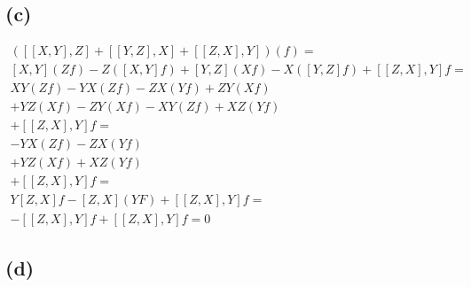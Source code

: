 \documentclass{article}
\begin{document}
\subsection*{(c)}
\begin{multline*}
([[X,Y],Z] +[[Y,Z],X] +[[Z,X],Y])(f)=\\
[X,Y](Zf)-Z([X,Y]f)
+[Y,Z](Xf)-X([Y,Z]f)
+[[Z,X],Y]f=\\
XY(Zf)-YX(Zf)-ZX(Yf)+ZY(Xf)\\
+YZ(Xf)-ZY(Xf)-XY(Zf)+XZ(Yf)\\
+[[Z,X],Y]f=\\
-YX(Zf)-ZX(Yf)\\
+YZ(Xf)+XZ(Yf)\\
+[[Z,X],Y]f=\\
Y[Z,X]f-[Z,X](YF)+[[Z,X],Y]f=\\
-[[Z,X],Y]f+[[Z,X],Y]f=0
\end{multline*}
\subsection*{(d)}
\end{document}
